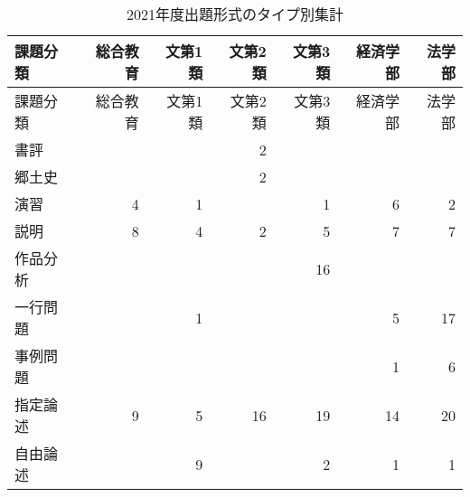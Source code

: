 \documentclass[11pt,a4paper,uplatex]{jsarticle}
\renewcommand\refname{参考文献}
\begin{document}
\begin{longtable}[]{@{}lrrrrrr@{}}
\caption{2021年度出題形式のタイプ別集計}\tabularnewline
\toprule\noalign{}
課題分類 & 総合教育 & 文第1類 & 文第2類 & 文第3類 & 経済学部 & 法学部 \\
\midrule\noalign{}
\endfirsthead
\toprule\noalign{}
課題分類 & 総合教育 & 文第1類 & 文第2類 & 文第3類 & 経済学部 & 法学部 \\
\midrule\noalign{}
\endhead
\bottomrule\noalign{}
\endlastfoot
書評 & & & 2 & & & \\
郷土史 & & & 2 & & & \\
演習 & 4 & 1 & & 1 & 6 & 2 \\
説明 & 8 & 4 & 2 & 5 & 7 & 7 \\
作品分析 & & & & 16 & & \\
一行問題 & & 1 & & & 5 & 17 \\
事例問題 & & & & & 1 & 6 \\
指定論述 & 9 & 5 & 16 & 19 & 14 & 20 \\
自由論述 & & 9 & & 2 & 1 & 1 \\
\end{longtable}

\theendnotes


\renewcommand\refname{参考文献}

\end{document}
